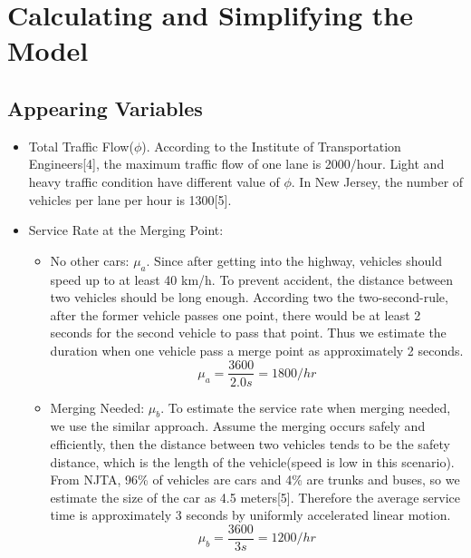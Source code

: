 \section{Calculating and Simplifying the Model}
\subsection{Appearing Variables}
\begin{itemize}
\item Total Traffic Flow($\phi$). According to the Institute of Transportation Engineers[4], the maximum traffic flow of one lane is 2000/hour. Light and heavy traffic condition have different value of $\phi$. In New Jersey, the number of vehicles per lane per hour is 1300[5].
\item Service Rate at the Merging Point:
\begin{itemize}
\item No other cars: $\mu_{a}$. Since after getting into the highway, vehicles should speed up to at least 40 km/h. To prevent accident, the distance between two vehicles should be long enough. According two the two-second-rule, after the former vehicle passes one point, there would be at least 2 seconds for the second vehicle to pass that point. Thus we estimate the duration when one vehicle pass a merge point as approximately 2 seconds.\\
\[
\mu_{a} = \frac{3600}{2.0 s} = 1800/hr
\]
\item Merging Needed: $\mu_{b}$. To estimate the service rate when merging needed, we use the similar approach. Assume the merging occurs safely and efficiently, then the distance between two vehicles tends to be the safety distance, which is the length of the vehicle(speed is low in this scenario). From NJTA, 96\% of vehicles are cars and 4\% are trunks and buses, so we estimate the size of the car as 4.5 meters[5]. Therefore the average service time is approximately 3 seconds by uniformly accelerated linear motion.\\
\[
\mu_{b} = \frac{3600}{3 s} = 1200/hr
\]
\end{itemize}
\end{itemize}

